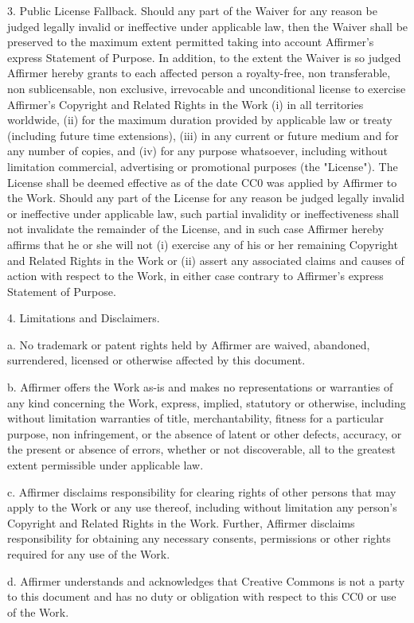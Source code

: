 \documentclass[a4paper,12pt]{article}
\begin{document}
\begin{appendices}
3. Public License Fallback. Should any part of the Waiver for any reason
be judged legally invalid or ineffective under applicable law, then the
Waiver shall be preserved to the maximum extent permitted taking into
account Affirmer's express Statement of Purpose. In addition, to the
extent the Waiver is so judged Affirmer hereby grants to each affected
person a royalty-free, non transferable, non sublicensable, non exclusive,
irrevocable and unconditional license to exercise Affirmer's Copyright and
Related Rights in the Work (i) in all territories worldwide, (ii) for the
maximum duration provided by applicable law or treaty (including future
time extensions), (iii) in any current or future medium and for any number
of copies, and (iv) for any purpose whatsoever, including without
limitation commercial, advertising or promotional purposes (the
"License"). The License shall be deemed effective as of the date CC0 was
applied by Affirmer to the Work. Should any part of the License for any
reason be judged legally invalid or ineffective under applicable law, such
partial invalidity or ineffectiveness shall not invalidate the remainder
of the License, and in such case Affirmer hereby affirms that he or she
will not (i) exercise any of his or her remaining Copyright and Related
Rights in the Work or (ii) assert any associated claims and causes of
action with respect to the Work, in either case contrary to Affirmer's
express Statement of Purpose.

4. Limitations and Disclaimers.

 a. No trademark or patent rights held by Affirmer are waived, abandoned,
    surrendered, licensed or otherwise affected by this document.
    
 b. Affirmer offers the Work as-is and makes no representations or
    warranties of any kind concerning the Work, express, implied,
    statutory or otherwise, including without limitation warranties of
    title, merchantability, fitness for a particular purpose, non
    infringement, or the absence of latent or other defects, accuracy, or
    the present or absence of errors, whether or not discoverable, all to
    the greatest extent permissible under applicable law.
    
 c. Affirmer disclaims responsibility for clearing rights of other persons
    that may apply to the Work or any use thereof, including without
    limitation any person's Copyright and Related Rights in the Work.
    Further, Affirmer disclaims responsibility for obtaining any necessary
    consents, permissions or other rights required for any use of the
    Work.
    
 d. Affirmer understands and acknowledges that Creative Commons is not a
    party to this document and has no duty or obligation with respect to
    this CC0 or use of the Work.

\end{appendices}
\end{document}
